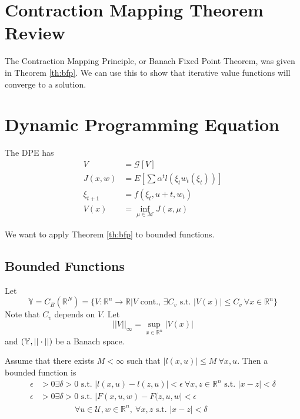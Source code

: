 
\mainmatter
\setcounter{page}{1}

\lectureseries[\course]{\course}

\date{October 22, 2009}

\setaddress

\setcounter{lecture}{7}
\setcounter{chapter}{7}


\section{Contraction Mapping Theorem Review}
The Contraction Mapping Principle, or Banach Fixed Point Theorem, was given in Theorem \ref{th:bfp}. We can use this to show that iterative value functions will converge to a solution.

\section{Dynamic Programming Equation}
The DPE has
\begin{align*}
V&=\mathcal{G}[V] \\
J(x,w) &= E[\sum\alpha^tl(\xi_tw_t(\xi_t))] \\
\xi_{t+1} &= f(\xi_t,u+t,w_t) \\
V(x) &= \inf_{\mu\in\mathcal{M}}J(x,\mu)
\end{align*}

We want to apply Theorem \ref{th:bfp} to bounded functions.

\subsection{Bounded Functions}
Let
$$\mathbb{Y} = C_B(\mathbb{R}^N) = \{V:\mathbb{R}^n\to\mathbb{R} | V \text{ cont., } \exists C_v \text{ s.t. } |V(x)|\leq C_v ~\forall x\in\mathbb{R}^n\}$$
Note that $C_v$ depends on $V$. Let
$$||V||_\infty = \sup_{x\in\mathbb{R}^n}|V(x)|$$
and $(\mathbb{Y},||\cdot||)$ be a Banach space.

Assume that there exists $M<\infty$ such that $|l(x,u)|\leq M ~\forall x,u$. Then a bounded function is
\begin{align*}
\epsilon&>0 \exists \delta>0 \text{ s.t. } |l(x,u)-l(z,u)|<\epsilon ~\forall x,z\in\mathbb{R}^n \text{ s.t. } |x-z|<\delta \\
\epsilon&>0 \exists \delta>0 \text{ s.t. } |F(x,u,w)-F(z,u,w|<\epsilon \\
&\qquad\qquad ~\forall u\in\mathcal{U},w\in\mathbb{R}^n, ~\forall x,z \text{ s.t. } |x-z|<\delta
\end{align*}

